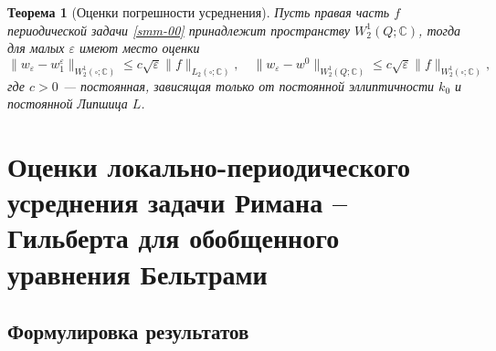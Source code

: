 \documentclass[a4paper,12pt]{article}
\newtheorem{theorem}{Теорема}[section]
\theoremstyle{definition}
\def\<{\left<}
\def\>{\right>}
\begin{document}
\begin{theorem}[Оценки погрешности усреднения]\label{smm-th1.8}
Пусть правая часть $f$ периодической задачи \eqref{smm-00} принадлежит пространству $W_2^1(Q;\mathbb{C})$, тогда для малых $\varepsilon$ имеют место оценки
		\begin{equation*}
			\|w_\varepsilon-w_1^\varepsilon\|_{W_2^1 (\square; \mathbb{C})}\leqslant c\sqrt{\varepsilon}\|f
			\|_{L_2 (\square; \mathbb{C})}, \quad \|w_\varepsilon-w^0\|_{W_2^1 (Q; \mathbb{C})}\leqslant c\sqrt{\varepsilon}\|f
			\|_{W_2^1 (\square; \mathbb{C})},
		\end{equation*}
		где $c>0$ --- постоянная, зависящая только от постоянной эллиптичности $k_0$ и постоянной Липшица $L$.
\end{theorem}

\section{Оценки локально-периодического усреднения задачи Римана -- Гильберта для обобщенного уравнения Бельтрами}	

\begin{abstract}\noindent
	Метод усреднения дифференциальных операторов, основанный на асимптотическом разложении по малому параметру, широко используется  в математической и физической литературе. Этот метод позволяет помимо теоремы усреднения получить
	оценки разности точного решения и его приближений.
	Рассмотрены оценки погрешности усреднения обобщенного уравнения Бельтрами с локально-периодическими коэффициентами $\mu(x,\varepsilon^{-1} x)$, $\nu(x,\varepsilon^{-1} x)$.
	\medskip\\

\end{abstract}

\subsection{Формулировка результатов}
\end{document}
